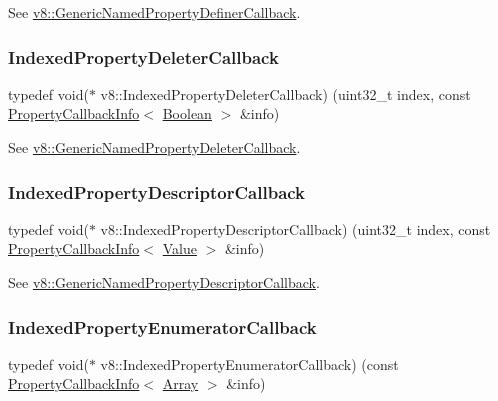 See {\ttfamily \mbox{\hyperlink{namespacev8_a66c854bc88d612ab4c65354bc0dc74a0}{v8\+::\+Generic\+Named\+Property\+Definer\+Callback}}}. \mbox{\label{namespacev8_a53863728de14cde48dd6543207b2f2da}} 
\subsubsection{\texorpdfstring{Indexed\+Property\+Deleter\+Callback}{IndexedPropertyDeleterCallback}}
{\footnotesize\ttfamily typedef void($\ast$ v8\+::\+Indexed\+Property\+Deleter\+Callback) (uint32\+\_\+t index, const \mbox{\hyperlink{classv8_1_1PropertyCallbackInfo}{Property\+Callback\+Info}}$<$ \mbox{\hyperlink{classv8_1_1Boolean}{Boolean}} $>$ \&info)}

See {\ttfamily \mbox{\hyperlink{namespacev8_ad2aecc0406ea4bc02d5a4f84a433b273}{v8\+::\+Generic\+Named\+Property\+Deleter\+Callback}}}. \mbox{\label{namespacev8_a7506e91d70d885b5cbeabdf870ac0e88}} 
\subsubsection{\texorpdfstring{Indexed\+Property\+Descriptor\+Callback}{IndexedPropertyDescriptorCallback}}
{\footnotesize\ttfamily typedef void($\ast$ v8\+::\+Indexed\+Property\+Descriptor\+Callback) (uint32\+\_\+t index, const \mbox{\hyperlink{classv8_1_1PropertyCallbackInfo}{Property\+Callback\+Info}}$<$ \mbox{\hyperlink{classv8_1_1Value}{Value}} $>$ \&info)}

See {\ttfamily \mbox{\hyperlink{namespacev8_a8cf8faa26baffa84173a24906c0d49f6}{v8\+::\+Generic\+Named\+Property\+Descriptor\+Callback}}}. \mbox{\label{namespacev8_adbb0a6d5537371953f9ba807d4f6275e}} 
\subsubsection{\texorpdfstring{Indexed\+Property\+Enumerator\+Callback}{IndexedPropertyEnumeratorCallback}}
{\footnotesize\ttfamily typedef void($\ast$ v8\+::\+Indexed\+Property\+Enumerator\+Callback) (const \mbox{\hyperlink{classv8_1_1PropertyCallbackInfo}{Property\+Callback\+Info}}$<$ \mbox{\hyperlink{classv8_1_1Array}{Array}} $>$ \&info)}

